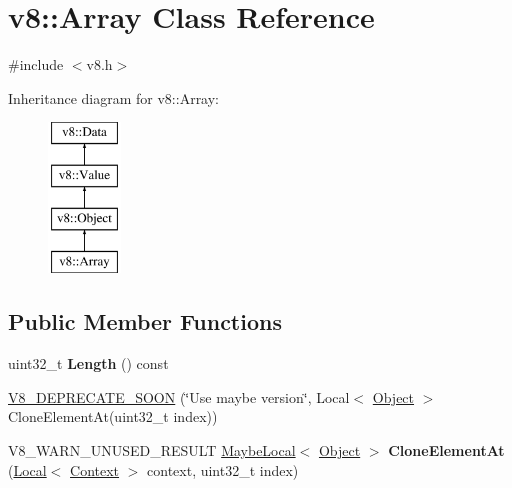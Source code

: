 \hypertarget{classv8_1_1Array}{}\section{v8\+:\+:Array Class Reference}
\label{classv8_1_1Array}


{\ttfamily \#include $<$v8.\+h$>$}

Inheritance diagram for v8\+:\+:Array\+:\begin{figure}[H]
\begin{center}
\leavevmode
\includegraphics[height=4.000000cm]{classv8_1_1Array}
\end{center}
\end{figure}
\subsection*{Public Member Functions}
\begin{DoxyCompactItemize}
\item 
\hypertarget{classv8_1_1Array_a3c47dfd8d26e60ed4fcdc683034d6d9c}{}uint32\+\_\+t {\bfseries Length} () const \label{classv8_1_1Array_a3c47dfd8d26e60ed4fcdc683034d6d9c}

\item 
\hyperlink{classv8_1_1Array_a3b1451b581932eef0d39c2c754adc1f9}{V8\+\_\+\+D\+E\+P\+R\+E\+C\+A\+T\+E\+\_\+\+S\+O\+O\+N} (\char`\"{}Use maybe version\char`\"{}, Local$<$ \hyperlink{classv8_1_1Object}{Object} $>$ Clone\+Element\+At(uint32\+\_\+t index))
\item 
\hypertarget{classv8_1_1Array_aceb6239f3ca3855174c58f19c49ebe6b}{}V8\+\_\+\+W\+A\+R\+N\+\_\+\+U\+N\+U\+S\+E\+D\+\_\+\+R\+E\+S\+U\+L\+T \hyperlink{classv8_1_1MaybeLocal}{Maybe\+Local}$<$ \hyperlink{classv8_1_1Object}{Object} $>$ {\bfseries Clone\+Element\+At} (\hyperlink{classv8_1_1Local}{Local}$<$ \hyperlink{classv8_1_1Context}{Context} $>$ context, uint32\+\_\+t index)\label{classv8_1_1Array_aceb6239f3ca3855174c58f19c49ebe6b}

\end{DoxyCompactItemize}
